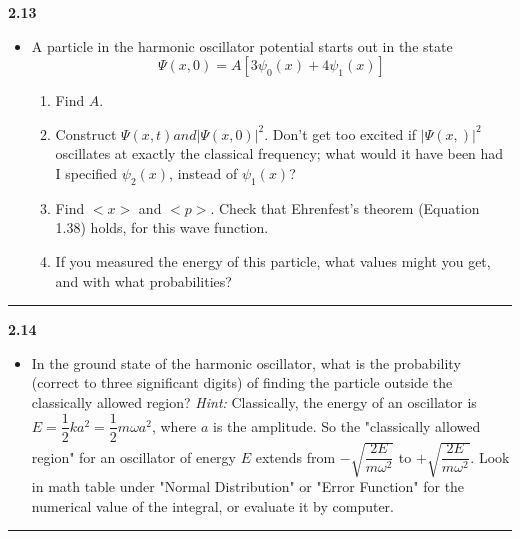 \documentclass[fleqn]{article}
\begin{document}
  \textbf{2.13}
  \begin{itemize}
    \item A particle in the harmonic oscillator potential starts out in the state 
    $$\Psi(x, 0)=A \left[3\psi_0(x)+4\psi_1(x)\right]$$ 
    \begin{enumerate}
      \item Find $A$.

      \item Construct $\Psi(x, t) and |\Psi(x, 0)|^2$. Don't get too excited if $|\Psi(x, )|^2$ oscillates 
      at exactly the classical frequency; what would it have been had I specified $\psi_2(x)$, instead of
      $\psi_1(x)$?

      \item Find $<x>$ and $<p>$. Check that Ehrenfest's theorem (Equation 1.38) holds, for this wave function.

      \item If you measured the energy of this particle, what values might you get, and with what probabilities?
    \end{enumerate}
  \end{itemize}

  \rule{15cm}{1pt}

  \textbf{2.14}
  \begin{itemize}
    \item In the ground state of the harmonic oscillator, what is the probability (correct to three
    significant digits) of finding the particle outside the classically allowed region?
    \emph{Hint:} Classically, the energy of an oscillator is $E=\dfrac{1}{2}ka^2=\dfrac{1}{2}m \omega a^2$,
    where $a$ is the amplitude. So the "classically allowed region" for an oscillator of energy $E$
    extends from $-\sqrt{\dfrac{2E}{m \omega^2}}$ to $+\sqrt{\dfrac{2E}{m \omega^2}}$. Look in math table
    under "Normal Distribution" or "Error Function" for the numerical value of the integral, or evaluate
    it by computer.
  \end{itemize}

  \rule{15cm}{1pt}
\end{document}
